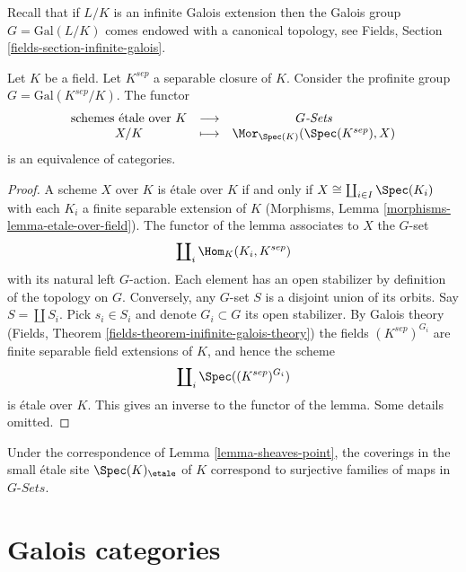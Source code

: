 \medskip\noindent
Recall that if $L/K$ is an infinite Galois extension then the
Galois group $G = \text{Gal}(L/K)$ comes endowed with a canonical
topology, see Fields, Section \ref{fields-section-infinite-galois}.

\begin{lemma}
\label{lemma-sheaves-point}
Let $K$ be a field. Let $K^{sep}$ a separable closure of $K$.
Consider the profinite group $G = \text{Gal}(K^{sep}/K)$.
The functor
$$
\begin{matrix}
\text{schemes \'etale over }K &
\longrightarrow &
G\textit{-Sets} \\
X/K & \longmapsto &
\Mor_{\Spec(K)}(\Spec(K^{sep}), X)
\end{matrix}
$$
is an equivalence of categories.
\end{lemma}

\begin{proof}
A scheme $X$ over $K$ is \'etale over $K$ if and only if
$X \cong \coprod_{i\in I} \Spec(K_i)$ with
each $K_i$ a finite separable extension of $K$
(Morphisms, Lemma \ref{morphisms-lemma-etale-over-field}).
The functor of the lemma associates to $X$ the $G$-set
$$
\coprod\nolimits_i \Hom_K(K_i, K^{sep})
$$
with its natural left $G$-action. Each element has an open stabilizer
by definition of the topology on $G$. Conversely, any $G$-set $S$
is a disjoint union of its orbits. Say $S = \coprod S_i$. Pick $s_i \in S_i$
and denote $G_i \subset G$ its open stabilizer. By Galois theory
(Fields, Theorem \ref{fields-theorem-inifinite-galois-theory})
the fields $(K^{sep})^{G_i}$ are finite separable field extensions of $K$, and
hence the scheme
$$
\coprod\nolimits_i \Spec((K^{sep})^{G_i})
$$
is \'etale over $K$. This gives an inverse to the functor of the lemma.
Some details omitted.
\end{proof}

\begin{remark}
\label{remark-covering-surjective}
Under the correspondence of Lemma \ref{lemma-sheaves-point},
the coverings in the small \'etale site
$\Spec(K)_\etale$ of $K$ correspond to surjective families of
maps in $G\textit{-Sets}$.
\end{remark}









\section{Galois categories}
\label{section-galois}

